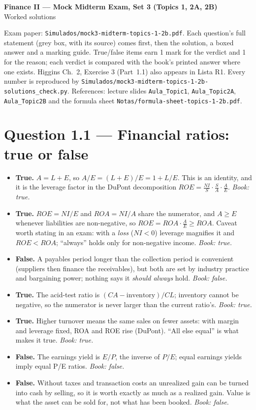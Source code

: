 \documentclass[11pt,a4paper]{article}
\numberwithin{equation}{section}
\newcommand{\statement}[1]{\par\smallskip\noindent\colorbox{black!5}{\parbox{\dimexpr\linewidth-2\fboxsep}{\small #1}}\par\medskip}
\newcommand{\tf}[3]{\item[#1] \textbf{#2.} #3}
\begin{document}
\begin{center}
  {\Large\bfseries Finance II --- Mock Midterm Exam, Set 3 (Topics 1, 2A, 2B)}\\[4pt]
  {\large Worked solutions}
\end{center}

{\sloppy\noindent Exam paper: \texttt{Simulados/mock3-midterm-topics-1-2b.pdf}. Each question's full
statement (grey box, with its source) comes first, then the solution, a boxed answer and a marking guide.
True/false items earn 1 mark for the verdict and 1 for the reason; each verdict is compared with the
book's printed answer where one exists. Higgins Ch.~2, Exercise 3 (Part~1.1) also appears in Lista R1.
Every number is reproduced by \texttt{Simulados/mock3-midterm-topics-1-2b-solutions\_check.py}.
References: lecture slides \texttt{Aula\_Topic1}, \texttt{Aula\_Topic2A}, \texttt{Aula\_Topic2B} and
the formula sheet \texttt{Notas/formula-sheet-topics-1-2b.pdf}.\par}

\section{Question 1.1 --- Financial ratios: true or false}

\statement{\QoneA}

\begin{itemize}[leftmargin=2em]
  \tf{a.}{True}{$A=L+E$, so $A/E=(L+E)/E=1+L/E$. This is an identity, and it is the leverage factor in
  the DuPont decomposition $ROE=\frac{NI}{S}\cdot\frac SA\cdot\frac AE$. \emph{Book: true.}}
  \tf{b.}{True}{$ROE=NI/E$ and $ROA=NI/A$ share the numerator, and $A\ge E$ whenever liabilities are
  non-negative, so $ROE=ROA\cdot\frac AE\ge ROA$. Caveat worth stating in an exam: with a \emph{loss}
  ($NI<0$) leverage magnifies it and $ROE<ROA$; ``always'' holds only for non-negative income.
  \emph{Book: true.}}
  \tf{c.}{False}{A payables period longer than the collection period is convenient (suppliers then
  finance the receivables), but both are set by industry practice and bargaining power; nothing says
  it \emph{should always} hold. \emph{Book: false.}}
  \tf{d.}{True}{The acid-test ratio is $(CA-\text{inventory})/CL$; inventory cannot be negative, so the
  numerator is never larger than the current ratio's. \emph{Book: true.}}
  \tf{e.}{True}{Higher turnover means the same sales on fewer assets: with margin and leverage fixed,
  ROA and ROE rise (DuPont). ``All else equal'' is what makes it true. \emph{Book: true.}}
  \tf{f.}{False}{The earnings yield is $E/P$, the inverse of $P/E$; equal earnings yields imply equal
  P/E ratios. \emph{Book: false.}}
  \tf{g.}{False}{Without taxes and transaction costs an unrealized gain can be turned into cash by
  selling, so it is worth exactly as much as a realized gain. Value is what the asset can be sold for,
  not what has been booked. \emph{Book: false.}}
\end{itemize}
\end{document}
